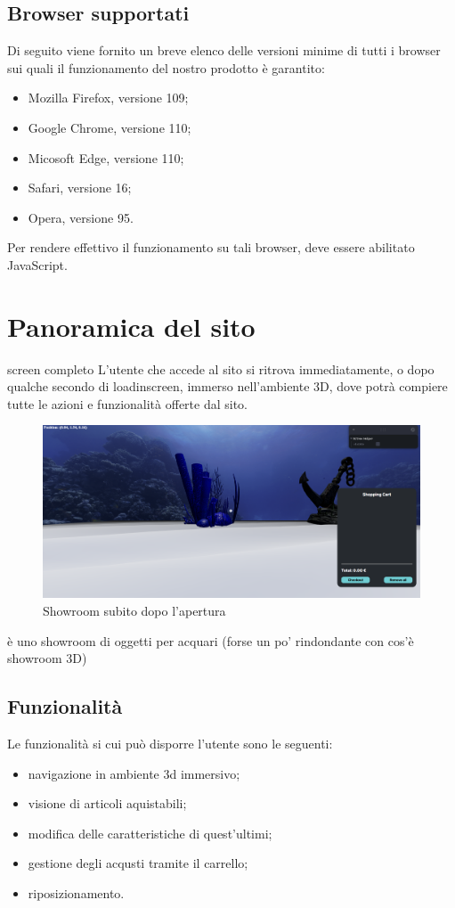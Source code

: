 \subsection{Browser supportati}
Di seguito viene fornito un breve elenco delle versioni minime di tutti i browser sui quali
il funzionamento del nostro prodotto è garantito:
\begin{itemize}
	\item Mozilla Firefox, versione 109;
	\item Google Chrome, versione 110;
	\item Micosoft Edge, versione 110;
	\item Safari, versione 16;
	\item Opera, versione 95.
\end{itemize}
Per rendere effettivo il funzionamento su tali browser, deve essere abilitato JavaScript.
\pagebreak



\section{Panoramica del sito}
screen completo
L'utente che accede al sito si ritrova immediatamente, o dopo qualche secondo di loadinscreen, immerso nell'ambiente 3D, dove potrà compiere tutte le azioni e funzionalità offerte dal sito. 
\begin{figure}[H]
  \renewcommand{\thefigure}{1}
  \includegraphics[width=\linewidth]{./res/images/schermata_iniziale.png}
  \caption{Showroom subito dopo l'apertura}
  \label{Showroom subito dopo l'apertura}
\end{figure}
è uno showroom di oggetti per acquari
(forse un po' rindondante con cos'è showroom 3D)
\subsection{Funzionalità}
Le funzionalità si cui può disporre l'utente sono le seguenti:
\begin{itemize}
\item navigazione in ambiente 3d immersivo;
\item visione di articoli aquistabili;
\item modifica delle caratteristiche di quest'ultimi;
\item gestione degli acqusti tramite il carrello;
\item riposizionamento.
\end{itemize}
\pagebreak

